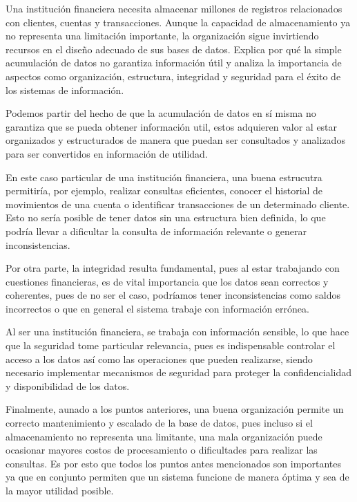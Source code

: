 \item Una institución financiera necesita almacenar millones de registros relacionados con clientes, cuentas y transacciones. Aunque la capacidad de almacenamiento ya no representa una limitación importante, la organización sigue invirtiendo recursos en el diseño adecuado de sus bases de datos. Explica por qué la simple acumulación de datos no garantiza información útil y analiza la importancia de aspectos como organización, estructura, integridad y seguridad para el éxito de los sistemas de información.

Podemos partir del hecho de que la acumulación de datos en sí misma no garantiza que se pueda obtener información util, estos adquieren valor al estar organizados y estructurados de manera que puedan ser consultados y analizados para ser convertidos en información de utilidad.

En este caso particular de una institución financiera, una buena estrucutra permitiría, por ejemplo, realizar consultas eficientes, conocer el historial de movimientos de una cuenta o identificar transacciones de un determinado cliente. Esto no sería posible de tener datos sin una estructura bien definida, lo que podría llevar a dificultar la consulta de información relevante o generar inconsistencias.

Por otra parte, la integridad resulta fundamental, pues al estar trabajando con cuestiones financieras, es de vital importancia que los datos sean correctos y coherentes, pues de no ser el caso, podríamos tener inconsistencias como saldos incorrectos o que en general el sistema trabaje con información errónea.

Al ser una institución financiera, se trabaja con información sensible, lo que hace que la seguridad tome particular relevancia, pues es indispensable controlar el acceso a los datos así como las operaciones que pueden realizarse, siendo necesario implementar mecanismos de seguridad para proteger la confidencialidad y disponibilidad de los datos.

Finalmente, aunado a los puntos anteriores, una buena organización permite un correcto mantenimiento y escalado de la base de datos, pues incluso si el almacenamiento no representa una limitante, una mala organización puede ocasionar mayores costos de procesamiento o dificultades para realizar las consultas. Es por esto que todos los puntos antes mencionados son importantes ya que en conjunto permiten que un sistema funcione de manera óptima y sea de la mayor utilidad posible.